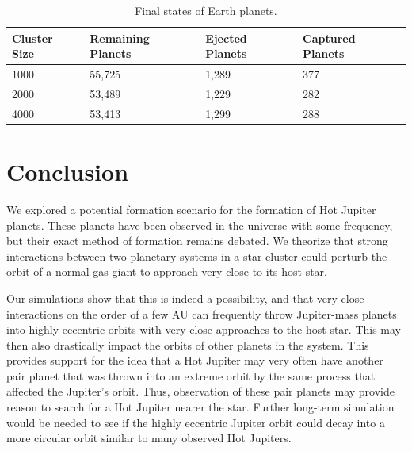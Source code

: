\documentclass[12pt]{article}
\begin{document}
    \begin{table}[H]
        \centering
        \caption{Final states of Earth planets.
        }
        \begin{tabular}{|llll|}
            \hline
            \textbf{Cluster Size} & \textbf{Remaining Planets} & \textbf{Ejected Planets} & \textbf{Captured Planets} \\
            \hline
            1000 & 55,725 & 1,289 & 377 \\
            2000 & 53,489 & 1,229 & 282 \\
            4000 & 53,413 & 1,299 & 288 \\
            \hline
        \end{tabular}
    \end{table}


\section{Conclusion}

We explored a potential formation scenario for the formation of Hot Jupiter
planets. These planets have been observed in the universe with some frequency,
but their exact method of formation remains debated. 
We theorize that strong interactions between two planetary systems in a star
cluster could perturb the orbit of a normal gas giant to approach very close to
its host star. 

Our simulations show that this is indeed a possibility, and that very close
interactions on the order of a few AU can frequently throw Jupiter-mass planets into
highly eccentric orbits with very close approaches to the host star. 
This may then also drastically impact the orbits of other planets
in the system. This provides support for the idea that a Hot Jupiter may very
often have another pair planet that was thrown into an extreme orbit by the same
process that affected the Jupiter's orbit. Thus,
observation of these pair planets may provide reason to search for a Hot Jupiter
nearer the star.
Further long-term simulation would be needed to see if the highly eccentric Jupiter
orbit could decay into a more circular orbit similar to many observed Hot Jupiters.


\clearpage
\end{document}
